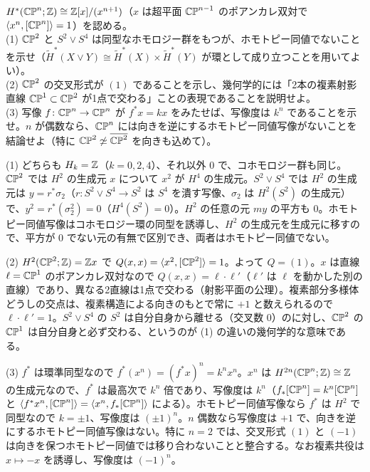 \begin{problem}[難易度 B]\label{ch06-prob-cp2}
$H^*(\mathbb{CP}^n;\mathbb{Z})\cong\mathbb{Z}[x]/(x^{n+1})$（$x$ は超平面 $\mathbb{CP}^{n-1}$ のポアンカレ双対で $\langle x^n,[\mathbb{CP}^n]\rangle=1$）を認める。\\
(1) $\mathbb{CP}^2$ と $S^2\vee S^4$ は同型なホモロジー群をもつが、ホモトピー同値でないことを示せ（$\tilde H^*(X\vee Y)\cong\tilde H^*(X)\times\tilde H^*(Y)$ が環として成り立つことを用いてよい）。\\
(2) $\mathbb{CP}^2$ の交叉形式が $(1)$ であることを示し、幾何学的には「2本の複素射影直線 $\mathbb{CP}^1\subset\mathbb{CP}^2$ が1点で交わる」ことの表現であることを説明せよ。\\
(3) 写像 $f\colon\mathbb{CP}^n\to\mathbb{CP}^n$ が $f^*x=kx$ をみたせば、写像度は $k^n$ であることを示せ。$n$ が偶数なら、$\mathbb{CP}^n$ には向きを逆にするホモトピー同値写像がないことを結論せよ（特に $\mathbb{CP}^2\not\simeq\overline{\mathbb{CP}^2}$ を向きも込めて）。
\end{problem}

\begin{solution}
(1) どちらも $H_k=\mathbb{Z}$（$k=0,2,4$）、それ以外 $0$ で、コホモロジー群も同じ。$\mathbb{CP}^2$ では $H^2$ の生成元 $x$ について $x^2$ が $H^4$ の生成元。$S^2\vee S^4$ では $H^2$ の生成元は $y=r^*\sigma_2$（$r\colon S^2\vee S^4\to S^2$ は $S^4$ を潰す写像、$\sigma_2$ は $H^2(S^2)$ の生成元）で、$y^2=r^*(\sigma_2^2)=0$（$H^4(S^2)=0$）。$H^2$ の任意の元 $my$ の平方も $0$。ホモトピー同値写像はコホモロジー環の同型を誘導し、$H^2$ の生成元を生成元に移すので、平方が $0$ でない元の有無で区別でき、両者はホモトピー同値でない。

(2) $H^2(\mathbb{CP}^2;\mathbb{Z})=\mathbb{Z} x$ で $Q(x,x)=\langle x^2,[\mathbb{CP}^2]\rangle=1$。よって $Q=(1)$。$x$ は直線 $\ell=\mathbb{CP}^1$ のポアンカレ双対なので $Q(x,x)=\ell\cdot\ell'$（$\ell'$ は $\ell$ を動かした別の直線）であり、異なる2直線は1点で交わる（射影平面の公理）。複素部分多様体どうしの交点は、複素構造による向きのもとで常に $+1$ と数えられるので $\ell\cdot\ell'=1$。$S^2\vee S^4$ の $S^2$ は自分自身から離せる（交叉数 $0$）のに対し、$\mathbb{CP}^2$ の $\mathbb{CP}^1$ は自分自身と必ず交わる、というのが (1) の違いの幾何学的な意味である。

(3) $f^*$ は環準同型なので $f^*(x^n)=(f^*x)^n=k^nx^n$。$x^n$ は $H^{2n}(\mathbb{CP}^n;\mathbb{Z})\cong\mathbb{Z}$ の生成元なので、$f^*$ は最高次で $k^n$ 倍であり、写像度は $k^n$（$f_*[\mathbb{CP}^n]=k^n[\mathbb{CP}^n]$ と $\langle f^*x^n,[\mathbb{CP}^n]\rangle=\langle x^n,f_*[\mathbb{CP}^n]\rangle$ による）。ホモトピー同値写像なら $f^*$ は $H^2$ で同型なので $k=\pm1$、写像度は $(\pm1)^n$。$n$ 偶数なら写像度は $+1$ で、向きを逆にするホモトピー同値写像はない。特に $n=2$ では、交叉形式 $(1)$ と $(-1)$ は向きを保つホモトピー同値では移り合わないことと整合する。なお複素共役は $x\mapsto-x$ を誘導し、写像度は $(-1)^n$。
\end{solution}

